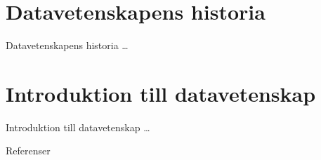 \documentclass{beamer}
\begin{document}
\section[Historia]{Datavetenskapens historia}
\begin{frame}{Datavetenskapens historia}
	\dots
\end{frame}


\section[Introduktion]{Introduktion till datavetenskap}
\begin{frame}{Introduktion till datavetenskap}
	\dots
\end{frame}



\begin{frame}{Referenser}
	
\end{frame}
\end{document}

